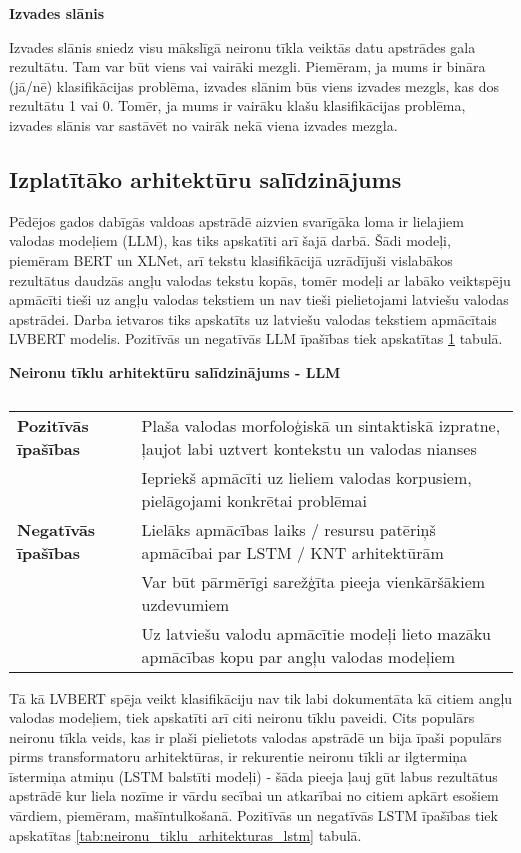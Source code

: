 \textbf{Izvades slānis}

Izvades slānis sniedz visu mākslīgā neironu tīkla veiktās datu apstrādes gala rezultātu. Tam var būt viens vai vairāki mezgli. Piemēram, ja mums ir bināra (jā/nē) klasifikācijas problēma, izvades slānim būs viens izvades mezgls, kas dos rezultātu 1 vai 0. Tomēr, ja mums ir vairāku klašu klasifikācijas problēma, izvades slānis var sastāvēt no vairāk nekā viena izvades mezgla.

\subsection{Izplatītāko arhitektūru salīdzinājums}

Pēdējos gados dabīgās valdoas apstrādē aizvien svarīgāka loma ir lielajiem valodas modeļiem (LLM), kas tiks apskatīti arī šajā darbā. Šādi modeļi, piemēram BERT un XLNet, arī tekstu klasifikācijā uzrādījuši vislabākos rezultātus daudzās angļu valodas tekstu kopās\cite{PapersWithCode}, tomēr modeļi ar labāko veiktspēju apmācīti tieši uz angļu valodas tekstiem un nav tieši pielietojami latviešu valodas apstrādei. Darba ietvaros tiks apskatīts uz latviešu valodas tekstiem apmācītais LVBERT modelis. Pozitīvās un negatīvās LLM īpašības tiek apskatītas \ref{tab:neironu_tiklu_arhitekturas_llm} tabulā.

\begin{table}[H]
\centering
\caption{\label{tab:neironu_tiklu_arhitekturas_llm}}
\textbf{Neironu tīklu arhitektūru salīdzinājums - LLM\\}
\begin{tabular}{| m{5cm} | m{10cm} |}
\hline
\textbf{Pozitīvās īpašības} & 
Plaša valodas morfoloģiskā un sintaktiskā izpratne, ļaujot labi uztvert kontekstu un valodas nianses \\ 
\cline{2-2}
 & Iepriekš apmācīti uz lieliem valodas korpusiem, pielāgojami konkrētai problēmai \\ 
\hline
\textbf{Negatīvās īpašības} & 
Lielāks apmācības laiks / resursu patēriņš apmācībai par LSTM / KNT arhitektūrām \\ 
\cline{2-2}
 & Var būt pārmērīgi sarežģīta pieeja vienkāršākiem uzdevumiem \\ 
 \cline{2-2}
 & Uz latviešu valodu apmācītie modeļi lieto mazāku apmācības kopu par angļu valodas modeļiem \\ 
\hline
\end{tabular}
\end{table}

Tā kā LVBERT spēja veikt klasifikāciju nav tik labi dokumentāta kā citiem angļu valodas modeļiem, tiek apskatīti arī citi neironu tīklu paveidi. Cits populārs neironu tīkla veids, kas ir plaši pielietots valodas apstrādē un bija īpaši populārs pirms transformatoru arhitektūras, ir rekurentie neironu tīkli ar ilgtermiņa īstermiņa atmiņu (LSTM balstīti modeļi) - šāda pieeja ļauj gūt labus rezultātus apstrādē kur liela nozīme ir vārdu secībai un atkarībai no citiem apkārt esošiem vārdiem, piemēram, mašīntulkošanā. Pozitīvās un negatīvās LSTM īpašības tiek apskatītas \ref{tab:neironu_tiklu_arhitekturas_lstm} tabulā.

